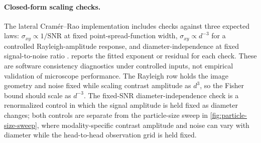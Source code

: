 \paragraph{Closed-form scaling checks.} The lateral Cram\'{e}r--Rao implementation includes checks against three expected laws: $\sigma_{xy}\propto 1/\mathrm{SNR}$ at fixed point-spread-function width, $\sigma_{xy}\propto d^{-3}$ for a controlled Rayleigh-amplitude response, and diameter-independence at fixed signal-to-noise ratio \cite{thompson-larson-webb,ober-ram-ward,juffmann-iscat-cobri-crlb}.  reports the fitted exponent or residual for each check. These are software consistency diagnostics under controlled inputs, not empirical validation of microscope performance. The Rayleigh row holds the image geometry and noise fixed while scaling contrast amplitude as $d^3$, so the Fisher bound should scale as $d^{-3}$. The fixed-SNR diameter-independence check is a renormalized control in which the signal amplitude is held fixed as diameter changes; both controls are separate from the particle-size sweep in \cref{fig:particle-size-sweep}, where modality-specific contrast amplitude and noise can vary with diameter while the head-to-head observation grid is held fixed.


